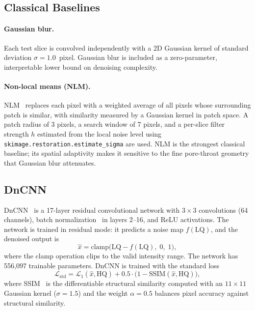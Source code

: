 \documentclass[review,12pt]{elsarticle}
\begin{document}
\subsection{Classical Baselines}
\label{sec:methods:classical}

\paragraph{Gaussian blur.}
Each test slice is convolved independently with a 2D Gaussian kernel
of standard deviation $\sigma = 1.0$~pixel.  Gaussian blur is included
as a zero-parameter, interpretable lower bound on denoising complexity.

\paragraph{Non-local means (NLM).}
NLM~\cite{Buades2005cvpr} replaces each pixel with a weighted average
of all pixels whose surrounding patch is similar, with similarity
measured by a Gaussian kernel in patch space.  A patch radius of 3
pixels, a search window of 7 pixels, and a per-slice filter strength
$h$ estimated from the local noise level using
\texttt{skimage.restoration.estimate\_sigma} are used.  NLM is the
strongest classical baseline; its spatial adaptivity makes it sensitive
to the fine pore-throat geometry that Gaussian blur attenuates.

\subsection{DnCNN}
\label{sec:methods:dncnn}

DnCNN~\cite{Zhang2017dncnn} is a 17-layer residual convolutional
network with $3 \times 3$ convolutions (64 channels), batch
normalization~\cite{Ioffe2015} in layers 2--16, and ReLU activations.
The network is trained in residual mode: it predicts a noise map
$f(\mathrm{LQ})$, and the denoised output is
\begin{equation}
  \hat{x} = \mathrm{clamp}\bigl(\mathrm{LQ} - f(\mathrm{LQ}),\; 0,\; 1\bigr),
  \label{eq:dncnn_output}
\end{equation}
where the clamp operation clips to the valid intensity range.  The
network has 556,097 trainable parameters.  DnCNN is trained with the
standard loss
\begin{equation}
  \mathcal{L}_{\mathrm{std}} =
  \mathcal{L}_{1}(\hat{x}, \mathrm{HQ}) +
  0.5 \cdot \bigl(1 - \mathrm{SSIM}(\hat{x}, \mathrm{HQ})\bigr),
  \label{eq:std_loss}
\end{equation}
where SSIM~\cite{Wang2004} is the differentiable structural similarity
computed with an $11 \times 11$ Gaussian kernel ($\sigma = 1.5$) and
the weight $\alpha = 0.5$ balances pixel accuracy against structural
similarity.
\end{document}
